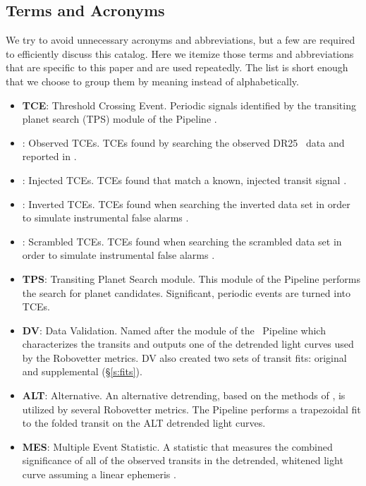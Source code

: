 \subsection{Terms and Acronyms}
\label{abbrev}
We try to avoid unnecessary acronyms and abbreviations, but a few are required to efficiently discuss this catalog.  Here we itemize those terms and abbreviations that are specific to this paper and are used repeatedly. The list is short enough that we choose to group them by meaning instead of alphabetically. 

\begin{itemize}

\item[] \textbf{TCE}: Threshold Crossing Event. Periodic signals identified by the transiting planet search (TPS) module of the \Kepler{} Pipeline \citep{JenkinsKDPH}.
\item[] \textbf{\opstce}: Observed TCEs. TCEs found by searching the observed DR25 \Kepler\ data and reported in \citet{Twicken2016}.
\item[] \textbf{\injtce}: Injected TCEs. TCEs found that match a known, injected transit signal \citep{Christiansen2017}.
\item[] \textbf{\invtce}: Inverted TCEs. TCEs found when searching the inverted data set in order to simulate instrumental false alarms \citep{Coughlin2017a}.
\item[] \textbf{\scrtce}: Scrambled TCEs. TCEs found when searching the scrambled data set in order to simulate instrumental false alarms \citep{Coughlin2017a}.
\item[] \textbf{TPS}: Transiting Planet Search module. This module of the \Kepler{} Pipeline performs the search for planet candidates. Significant, periodic events are turned into  TCEs.
\item[] \textbf{DV}: Data Validation. Named after the module of the \Kepler\ Pipeline \citep{JenkinsKDPH} which characterizes the transits and outputs one of the detrended light curves used by the Robovetter metrics.  DV also created two sets of transit fits: original and supplemental (\S\ref{s:fits}).
\item[] \textbf{ALT}: Alternative. An alternative detrending, based on the methods of \citet{Garcia2010}, is utilized by several Robovetter metrics. The \Kepler{} Pipeline performs a trapezoidal fit to the folded transit on the ALT detrended light curves.
\item[] \textbf{MES}: Multiple Event Statistic. A statistic that measures the combined significance of all of the observed transits in the detrended, whitened light curve assuming a linear ephemeris \citep[][]{Jenkins2002b}.

\end{itemize}
